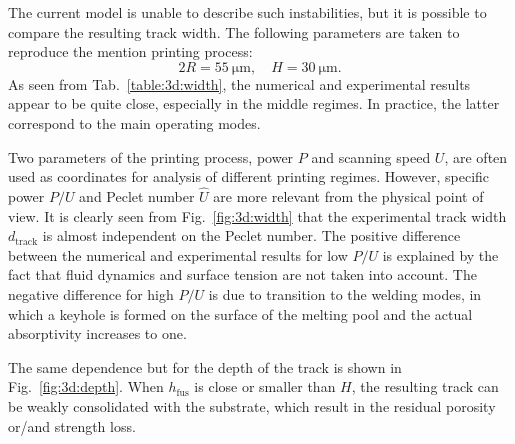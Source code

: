 \documentclass{article}
\newcommand{\HU}{\hat{U}}
\begin{document}
The current model is unable to describe such instabilities,
but it is possible to compare the resulting track width.
The following parameters are taken to reproduce the mention printing process:
\begin{equation}\label{eq:single:trumpf}
    2R = \SI{55}{\um}, \quad H=\SI{30}{\um}.
\end{equation}
As seen from Tab.~\ref{table:3d:width}, the numerical and experimental results appear to be quite close,
especially in the middle regimes. In practice, the latter correspond to the main operating modes.

Two parameters of the printing process, power \(P\) and scanning speed \(U\),
are often used as coordinates for analysis of different printing regimes.
However, specific power \(P/U\) and Peclet number \(\HU\) are more relevant
from the physical point of view.
It is clearly seen from Fig.~\ref{fig:3d:width} that the experimental track width \(d_\mathrm{track}\)
is almost independent on the Peclet number.
The positive difference between the numerical and experimental results for low \(P/U\) is
explained by the fact that fluid dynamics and surface tension are not taken into account.
The negative difference for high \(P/U\) is due to transition to the welding modes,
in which a keyhole is formed on the surface of the melting pool and the actual absorptivity increases to one.

The same dependence but for the depth of the track is shown in Fig.~\ref{fig:3d:depth}.
When \(h_\mathrm{fus}\) is close or smaller than \(H\),
the resulting track can be weakly consolidated with the substrate,
which result in the residual porosity or/and strength loss.


\printbibliography
\end{document}

